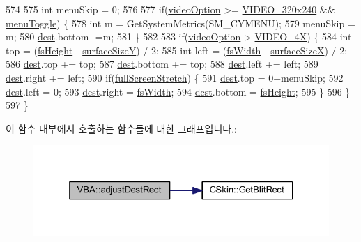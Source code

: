 \begin{DoxyCode}
574   
575   \textcolor{keywordtype}{int} menuSkip = 0;
576   
577   \textcolor{keywordflow}{if}(\mbox{\hyperlink{class_v_b_a_a17dac073149c897f770c00ed7098ad32}{videoOption}} >= \mbox{\hyperlink{_v_b_a_8h_a531c35e38ede3ea4e5ba5afb24b29493a658665cfbdbd908bdb77babe125d0341}{VIDEO\_320x240}} && \mbox{\hyperlink{class_v_b_a_a0bacc38e144832326c5d4d6df6ababa3}{menuToggle}}) \{
578     \textcolor{keywordtype}{int} m = GetSystemMetrics(SM\_CYMENU);
579     menuSkip = m;
580     \mbox{\hyperlink{class_v_b_a_aed77fc82f818810cc87c470768c75e05}{dest}}.bottom -=m;
581   \}
582 
583   \textcolor{keywordflow}{if}(\mbox{\hyperlink{class_v_b_a_a17dac073149c897f770c00ed7098ad32}{videoOption}} > \mbox{\hyperlink{_v_b_a_8h_a531c35e38ede3ea4e5ba5afb24b29493a6468bce6b84e6350d3de126f257eb38d}{VIDEO\_4X}}) \{
584     \textcolor{keywordtype}{int} top = (\mbox{\hyperlink{class_v_b_a_a1e59d9254f1cb6420502c537c35dd5ec}{fsHeight}} - \mbox{\hyperlink{class_v_b_a_a63dc67ff3aa9347f32f583fee92cf609}{surfaceSizeY}}) / 2;
585     \textcolor{keywordtype}{int} left = (\mbox{\hyperlink{class_v_b_a_a92ef1c149914189da4d110d6dada54bb}{fsWidth}} - \mbox{\hyperlink{class_v_b_a_a14ab3c3ab83f07d70e2a40090e37deea}{surfaceSizeX}}) / 2;
586     \mbox{\hyperlink{class_v_b_a_aed77fc82f818810cc87c470768c75e05}{dest}}.top += top;
587     \mbox{\hyperlink{class_v_b_a_aed77fc82f818810cc87c470768c75e05}{dest}}.bottom += top;
588     \mbox{\hyperlink{class_v_b_a_aed77fc82f818810cc87c470768c75e05}{dest}}.left += left;
589     \mbox{\hyperlink{class_v_b_a_aed77fc82f818810cc87c470768c75e05}{dest}}.right += left;
590     \textcolor{keywordflow}{if}(\mbox{\hyperlink{class_v_b_a_a00bd5b85110bd763ad39eb4a9fb403a1}{fullScreenStretch}}) \{
591       \mbox{\hyperlink{class_v_b_a_aed77fc82f818810cc87c470768c75e05}{dest}}.top = 0+menuSkip;
592       \mbox{\hyperlink{class_v_b_a_aed77fc82f818810cc87c470768c75e05}{dest}}.left = 0;
593       \mbox{\hyperlink{class_v_b_a_aed77fc82f818810cc87c470768c75e05}{dest}}.right = \mbox{\hyperlink{class_v_b_a_a92ef1c149914189da4d110d6dada54bb}{fsWidth}};
594       \mbox{\hyperlink{class_v_b_a_aed77fc82f818810cc87c470768c75e05}{dest}}.bottom = \mbox{\hyperlink{class_v_b_a_a1e59d9254f1cb6420502c537c35dd5ec}{fsHeight}};
595     \}          
596   \}
597 \}
\end{DoxyCode}
이 함수 내부에서 호출하는 함수들에 대한 그래프입니다.\+:
\nopagebreak
\begin{figure}[H]
\begin{center}
\leavevmode
\includegraphics[width=325pt]{class_v_b_a_acb822065cba8b15810c5a61fd05ca831_cgraph}
\end{center}
\end{figure}
